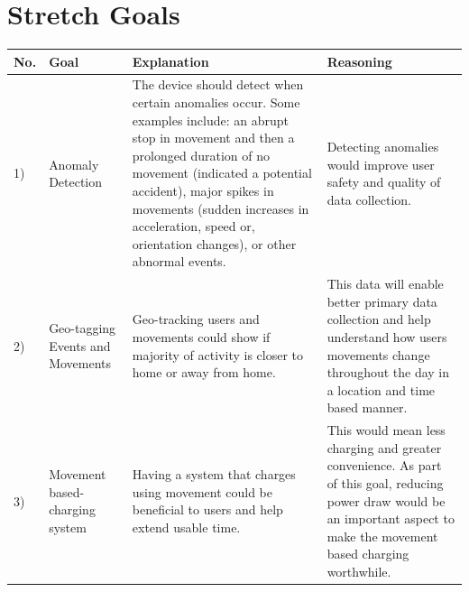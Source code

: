 \documentclass[12pt]{article}
\begin{document}
\section{Stretch Goals}
\begin{center}
    \begin{tabular}{ | m{2em} | m{7em} | m{16em}| m{12em} | }
        \hline
        \textbf{No.} & \textbf{Goal}                   & \textbf{Explanation} &  \textbf{Reasoning}                                                                                                                                                                                                                                                                                                                                                           \\
        \hline
        1) & Anomaly \linebreak Detection               & The device should detect when certain anomalies occur. Some examples include: an abrupt stop in movement and then a prolonged duration of no movement (indicated a potential accident), major spikes in movements (sudden increases in acceleration, speed or, orientation changes), or other abnormal events. & Detecting anomalies would improve user safety and quality of data collection. \\
        \hline
      2) &   Geo-tagging Events and Movements & Geo-tracking users and movements could show if majority of activity is closer to home or away from home. &  This data will enable better primary data collection and help understand how users movements change throughout the day in a location and time based manner.                                                                                                  \\
        \hline
      3) &   Movement based-charging system  & Having a system that charges using movement could be beneficial to users and help extend usable time. & This would mean less charging and greater convenience. As part of this goal, reducing power draw would be an important aspect to make the movement based charging worthwhile.                                                                                                            \\
        \hline
    \end{tabular}
\end{center}
\end{document}
